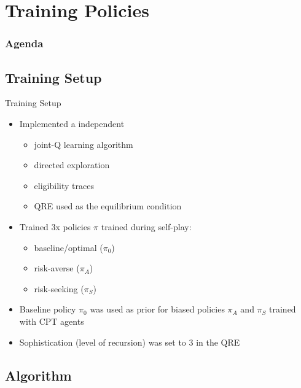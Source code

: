 \documentclass[aspectratio=1610, xcolor=dvipsnames]{packages/beamer}
\newcommand{\displayTOC}{\begin{frame}\frametitle{Agenda} \tableofcontents[currentsection, subsectionstyle=show/show/hide]\end{frame}}
\begin{document}
\section{Training Policies} \displayTOC



\subsection{Training Setup} \begin{frame}{Training Setup}
    \begin{itemize}
        \item Implemented a independent
        \begin{itemize}
            \item joint-Q learning algorithm
            \item directed exploration
            \item eligibility traces
            \item \Ac{QRE} used as the equilibrium condition
        \end{itemize}
        \item Trained 3x policies $\pi$ trained during self-play:
        \begin{itemize}
            \item baseline/optimal ($\pi_{0}$)
            \item risk-averse ($\pi_{A}$)
            \item risk-seeking ($\pi_{S}$)
        \end{itemize}
        \item Baseline policy $\pi_{0}$ was used as prior for biased policies $\pi_{A}$ and $\pi_{S}$ trained with \ac{CPT} agents
        \item Sophistication (level of recursion) was set to 3 in the \ac{QRE}
    \end{itemize}
\end{frame}

\subsection{Algorithm}
\end{document}
